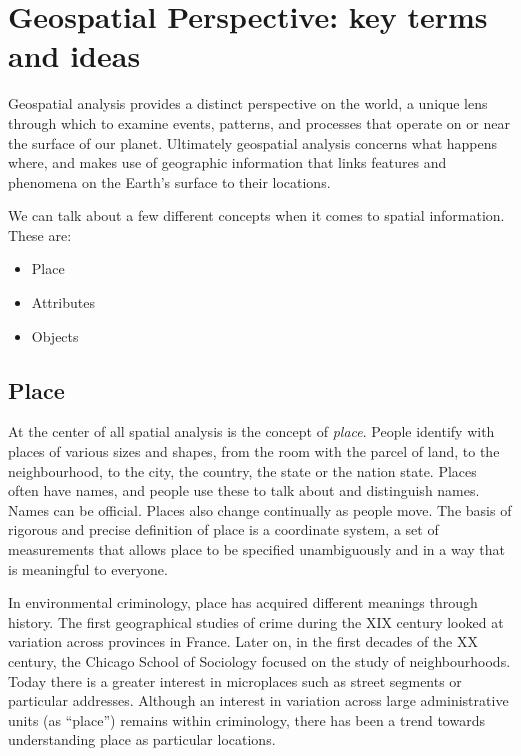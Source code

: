 \documentclass[
]{book}
\providecommand{\tightlist}{%
  \setlength{\itemsep}{0pt}\setlength{\parskip}{0pt}}
\begin{document}
\hypertarget{geospatial-perspective-key-terms-and-ideas}{%
\section{Geospatial Perspective: key terms and ideas}\label{geospatial-perspective-key-terms-and-ideas}}

Geospatial analysis provides a distinct perspective on the world, a unique lens through which to examine events, patterns, and processes that operate on or near the surface of our planet. Ultimately geospatial analysis concerns what happens where, and makes use of geographic information that links features and phenomena on the Earth's surface to their locations.

We can talk about a few different concepts when it comes to spatial information. These are:

\begin{itemize}
\tightlist
\item
  Place
\item
  Attributes
\item
  Objects
\end{itemize}

\hypertarget{place}{%
\subsection{Place}\label{place}}

At the center of all spatial analysis is the concept of \emph{place}. People identify with places of various sizes and shapes, from the room with the parcel of land, to the neighbourhood, to the city, the country, the state or the nation state. Places often have names, and people use these to talk about and distinguish names. Names can be official. Places also change continually as people move. The basis of rigorous and precise definition of place is a coordinate system, a set of measurements that allows place to be specified unambiguously and in a way that is meaningful to everyone.

In environmental criminology, place has acquired different meanings through history. The first geographical studies of crime during the XIX century looked at variation across provinces in France. Later on, in the first decades of the XX century, the Chicago School of Sociology focused on the study of neighbourhoods. Today there is a greater interest in microplaces such as street segments or particular addresses. Although an interest in variation across large administrative units (as ``place'') remains within criminology, there has been a trend towards understanding place as particular locations.
\end{document}
